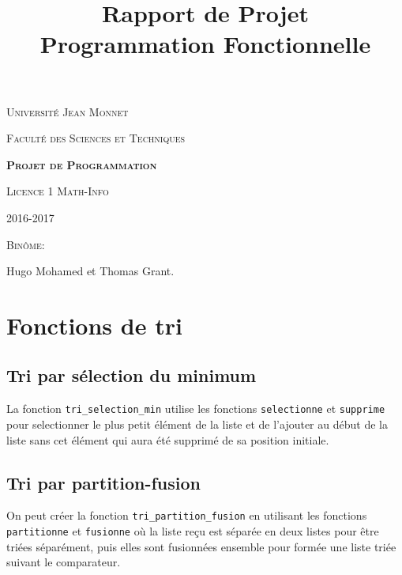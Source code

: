 \documentclass[a4paper, 11pt]{article}
\title{Rapport de Projet 
\\ Programmation Fonctionnelle}
\date{}
\begin{document}
\begin{titlepage}
\center

{\Large \textsc{Université Jean Monnet}}

\vspace*{1cm}

{\Large \textsc{Faculté des Sciences et Techniques}}

\vfill

{\huge \bf \textsc{Projet de Programmation}}

\vspace*{1cm}

{\Large \textsc{Licence 1 Math-Info}}


{\large 2016-2017}

\vfill


\vspace*{0.5cm}

{\large \textsc{Binôme:}}

\vspace*{0.5cm}

Hugo Mohamed et Thomas Grant.

\end{titlepage}

\newpage
\tableofcontents
\newpage

\section{Fonctions de tri}
\subsection{Tri par sélection du minimum}
La fonction \texttt{tri\_selection\_min} utilise les fonctions \texttt{selectionne} et \texttt{supprime} pour selectionner le plus petit élément de la liste et de l'ajouter au début de la liste sans cet élément qui aura été supprimé de sa position initiale.

\subsection{Tri par partition-fusion}
On peut créer la fonction \texttt{tri\_partition\_fusion} en utilisant les fonctions \texttt{partitionne} et \texttt{fusionne} où la liste reçu est séparée en deux listes pour être triées séparément, puis elles sont fusionnées ensemble pour formée une liste triée suivant le comparateur.
\end{document}
